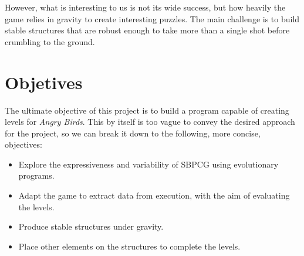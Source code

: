However, what is interesting to us is not its wide success, but how heavily the game relies in gravity to create interesting puzzles. The main challenge is to build stable structures that are robust enough to take more than a single shot before crumbling to the ground.

\section{Objetives}

The ultimate objective of this project is to build a program capable of creating levels for \textit{Angry Birds}. This by itself is too vague to convey the desired approach for the project, so we can break it down to the following, more concise, objectives:

\begin{itemize}
	\item Explore the expressiveness and variability of \ac{SBPCG} using evolutionary programs.
	\item Adapt the game to extract data from execution, with the aim of evaluating the levels.
	\item Produce stable structures under gravity.
	\item Place other elements on the structures to complete the levels.
\end{itemize} 

